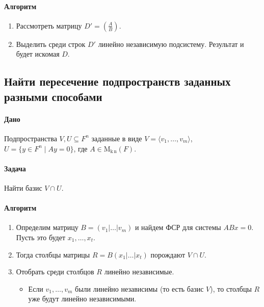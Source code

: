 \documentclass{article}
\newcommand{\MatrixDim}[3]{\operatorname{\mathrm{M}_{#2\,#3}}(#1)}
\begin{document}
\paragraph{Алгоритм}

\begin{enumerate}
\item Рассмотреть матрицу $D' = \left(\frac{A}{B}\right)$.

\item Выделить среди строк $D'$ линейно независимую подсистему.
Результат и будет искомая $D$.
\end{enumerate}


\subsection{Найти пересечение подпространств заданных разными способами}

\paragraph{Дано}

Подпространства $V,U\subseteq F^{n}$ заданные в виде $V =\langle v_1,\ldots,v_m\rangle$, $U = \{y\in F^{n}\mid Ay = 0\}$, где $A\in \MatrixDim{F}{k}{n}$.

\paragraph{Задача}

Найти базис $V \cap U$.

\paragraph{Алгоритм}
\begin{enumerate}
\item Определим матрицу $B = (v_1|\ldots|v_m)$ и найдем ФСР для системы $AB x = 0$. Пусть это будет $x_1,\ldots, x_t$.

\item Тогда столбцы матрицы $R = B (x_1|\ldots|x_t)$ порождают $V \cap U$.

\item Отобрать среди столбцов $R$ линейно независимые.
\begin{itemize}
\item Если $v_1,\ldots,v_m$ были линейно независимы (то есть базис $V$), то столбцы $R$ уже будут линейно независимыми.
\end{itemize}
\end{enumerate}
\end{document}
